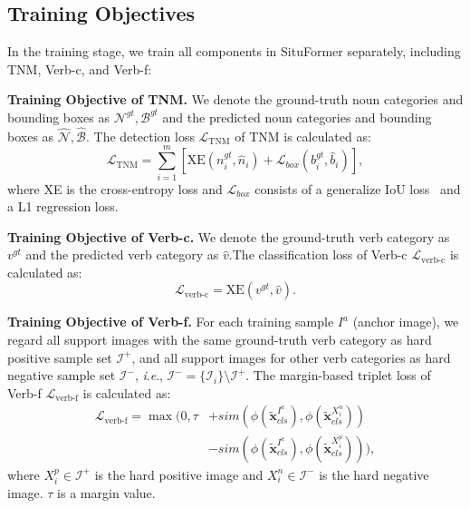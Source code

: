 \documentclass[letterpaper]{article} %
\newcommand{\ie}{\textit{i}.\textit{e}.}
\begin{document}


\subsection{Training Objectives}
\label{sec:training}

In the training stage, we train all components in SituFormer separately, including TNM, Verb-c, and Verb-f:

\noindent\textbf{Training Objective of TNM.}
We denote the ground-truth noun categories and bounding boxes as $\mathcal{N}^{gt}, \mathcal{B}^{gt}$ and the predicted noun categories and bounding boxes as $\hat{\mathcal{N}},\hat{\mathcal{B}}$. The detection loss $\mathcal{L}_{\text{TNM}}$ of TNM is calculated as:
\begin{equation}
   \mathcal{L}_{\text{TNM}} = \sum_{i=1}^{m} \left[\text{XE}(n^{gt}_i, \hat{n}_i) + \mathcal{L}_{box}(b^{gt}_i, \hat{b}_i)\right],
\end{equation}
where XE is the cross-entropy loss and $\mathcal{L}_{box}$ consists of a generalize IoU loss~\cite{rezatofighi2019generalized} and a L1 regression loss.

\noindent\textbf{Training Objective of Verb-c.}
We denote the ground-truth verb category as $v^{gt}$ and the predicted verb category as $\hat{v}$.The classification loss of Verb-c $\mathcal{L}_{\text{verb-c}}$ is calculated as:
\begin{equation}
    \mathcal{L}_{\text{verb-c}} = \text{XE}(v^{gt}, \hat{v}).
\end{equation}

\noindent\textbf{Training Objective of Verb-f.}
For each training sample $I^a$ (anchor image), we regard all support images with the same ground-truth verb category as hard positive sample set $\mathcal{I}^+$, and all support images for other verb categories as hard negative sample set $\mathcal{I}^-$, \ie, $\mathcal{I}^- = \{\mathcal{I}_i\}\setminus \mathcal{I}^+$. The margin-based triplet loss of Verb-f $\mathcal{L}_{\text{verb-f}}$ is calculated as: 
\begin{equation}
\begin{aligned}
    \mathcal{L}_{\text{verb-f}} = \max (0, \tau & +  sim(\phi(\tilde{\bm{x}}_{cls}^{I^{a}}), 
    \phi (\tilde{\bm{x}}_{cls}^{X_{i}^{n}}))  \\
    & - sim(\phi(\tilde{\bm{x}}_{cls}^{I^{a}}), \phi (\tilde{\bm{x}}_{cls}^{X_{i}^{p}}))),
\end{aligned}
\end{equation}
where $X_{i}^{p} \in \mathcal{I}^{+} $ is the hard positive image and  $X_{i}^{n} \in \mathcal{I}^{-} $ is the hard negative image. $\tau$ is a margin value.
\end{document}
